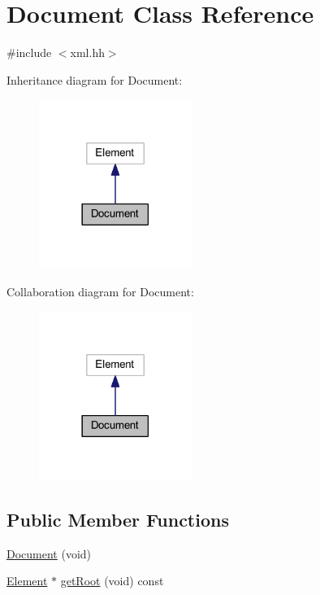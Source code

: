 \hypertarget{class_document}{}\section{Document Class Reference}
\label{class_document}


{\ttfamily \#include $<$xml.\+hh$>$}



Inheritance diagram for Document\+:
\nopagebreak
\begin{figure}[H]
\begin{center}
\leavevmode
\includegraphics[width=141pt]{class_document__inherit__graph}
\end{center}
\end{figure}


Collaboration diagram for Document\+:
\nopagebreak
\begin{figure}[H]
\begin{center}
\leavevmode
\includegraphics[width=141pt]{class_document__coll__graph}
\end{center}
\end{figure}
\subsection*{Public Member Functions}
\begin{DoxyCompactItemize}
\item 
\mbox{\hyperlink{class_document_a58318b5709ed43b98630923fd7acdf4e}{Document}} (void)
\item 
\mbox{\hyperlink{class_element}{Element}} $\ast$ \mbox{\hyperlink{class_document_ad9f1827ee45d31ba0a682db474b96c14}{get\+Root}} (void) const
\end{DoxyCompactItemize}



